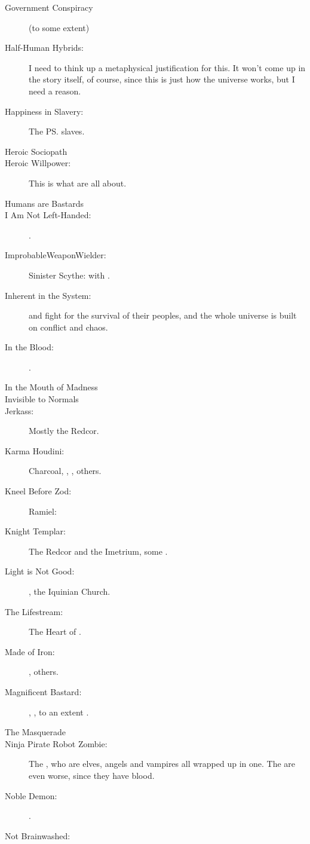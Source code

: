 \begin{flushleft}
\begin{description}
  \item[Government Conspiracy] (to some extent)
  \item[Half-Human Hybrids:] 
    I need to think up a metaphysical justification for this. It won't come up in the story itself, of course, since this is just how the \Miith{} universe works, but I need a reason.
  \item[Happiness in Slavery:] The \ps{\resphain} \human{} slaves.
  \item[Heroic Sociopath] 
  \item[Heroic Willpower:] This is what \vertices{} are all about. 
  \item[Humans are Bastards] 
  \item[I Am Not Left-Handed:] \Ishnaruchaefir. 
  \item[ImprobableWeaponWielder:]
    \subitem Sinister Scythe: \Ishnaruchaefir{} with \Triestessakhin. 
  \item[Inherent in the System:] 
    \Dragons{} and \banes{} fight for the survival of their peoples, and the whole universe is built on conflict and chaos.
  \item[In the Blood:] .
  \item[In the Mouth of Madness] 
  \item[Invisible to Normals]
  \item[Jerkass:] Mostly the Redcor. 
  \item[Karma Houdini:] Charcoal, \Nzessua, \HriistD, others. 
  \item[Kneel Before Zod:] 
    Ramiel: 
  \item[Knight Templar:] The Redcor and the Imetrium, some \resphain.
  \item[Light is Not Good:] \Teshrial, the Iquinian Church. 
  \item[The Lifestream:] The Heart of \Miith{}.
  \item[Made of Iron:] \Ishnaruchaefir, others. 
  \item[Magnificent Bastard:] \Daggerrain, \HriistD, to an extent \Ishna.
  \item[The Masquerade]
  \item[Ninja Pirate Robot Zombie:] 
    The \resphain, who are elves, angels and vampires all wrapped up in one. 
    The \satharioth{} are even worse, since they have \dragon{} blood.
  \item[Noble Demon:] \Ishnaruchaefir. 
  \item[Not Brainwashed:] 

\end{description}
\end{flushleft}
